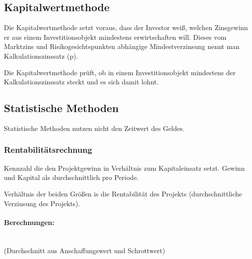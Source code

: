 \subsection{Kapitalwertmethode}
Die Kapitalwertmethode setzt voraus, dass der Investor weiß, welchen {\flqq Zinsgewinn\frqq} er aus einem Investitionsobjekt mindestens erwirtschaften will. Dieses vom Marktzins und Risikogesichtspunkten abhängige Mindestverzinsung nennt man Kalkulationszinssatz (p).

Die Kapitalwertmethode prüft, ob in einem Investitionsobjekt mindestens der Kalkulationszinssatz steckt und es sich damit lohnt.

\subsection{Statistische Methoden}
Statistische Methoden nutzen nicht den Zeitwert des Geldes.

\subsubsection{Rentabilitätsrechnung}
Kennzahl die den Projektgewinn in Verhältnis zum Kapitaleinsatz setzt. Gewinn und Kapital als durchschnittlich pro Periode.

Verhältnis der beiden Größen is die Rentabilität des Projekts (durchschnittliche Verzinsung des Projekts).





\paragraph{Berechnungen:}\quad\\
 (Durchschnitt aus Anschaffungswert und Schrottwert)\\
\\
\\

